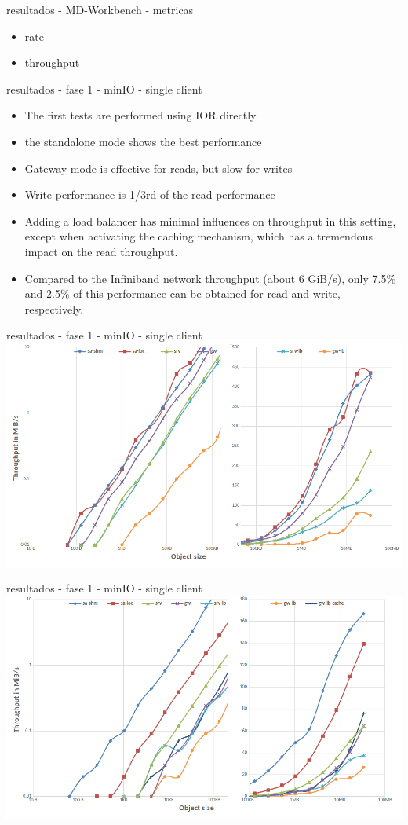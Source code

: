 \documentclass{beamer}
\begin{document}
\begin{frame}{resultados - MD-Workbench - metricas}
	\begin{itemize}
		\item rate
		\item throughput
	\end{itemize}
\end{frame}

\begin{frame}{resultados - fase 1 - minIO - single client}
	\begin{itemize}
		\item The first tests are performed using IOR directly
		\item the standalone mode shows the best performance
		\item Gateway mode is effective for reads,
		but slow for writes
		\item Write performance is 1/3rd of the read performance
		\item Adding a load balancer has minimal
		influences on throughput in this setting, except when activating the caching mechanism,
		which has a tremendous impact on the read throughput.
		\item Compared to the
		Infiniband network throughput (about 6 GiB/s), only 7.5\% and 2.5\% of this performance
		can be obtained for read and write, respectively.
	\end{itemize}
\end{frame}
\begin{frame}{resultados - fase 1 - minIO - single client}
    \includegraphics[width=0.9\paperwidth]{presentation/7.png}
\end{frame}
\begin{frame}{resultados - fase 1 - minIO - single client}
    \includegraphics[width=0.9\paperwidth]{presentation/8.png}
\end{frame}
\end{document}
